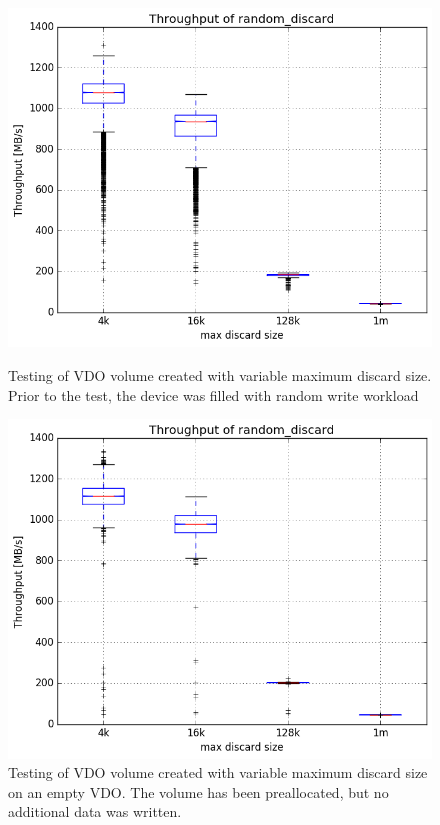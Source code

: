 \documentclass[
  color, %
  table, %
  lof,   %
  lot,   %
]{fithesis3}
\begin{document}
\begin{figure}[!htb]
        \centering
        \includegraphics[width=\textwidth]{../results/discards/full_VDO/report/random_discard1_compare_boxplots}
\caption[Testing of VDO volume created with variable maximum discard size]{Testing of VDO volume created with variable maximum discard size. Prior to the test, the device was filled with random write workload}
\label{fig:discard-full}
        \centering
        \includegraphics[width=\textwidth]{../results/discards/empty_VDO/report/random_discard1_compare_boxplots}
\caption[Testing of VDO volume created with variable maximum discard size on an empty VDO]{Testing of VDO volume created with variable maximum discard size on an empty VDO. The volume has been preallocated, but no additional data was written.}
\label{fig:discard-empty}
\end{figure}
\end{document}
